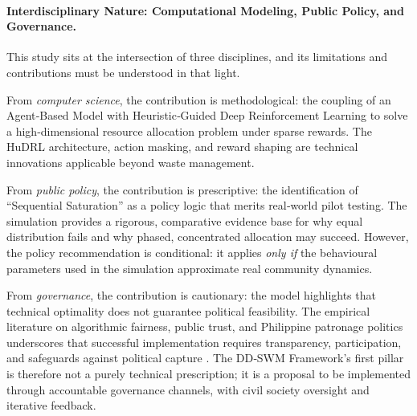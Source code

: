 \paragraph{Interdisciplinary Nature: Computational Modeling, Public Policy, and Governance.}
This study sits at the intersection of three disciplines, and its limitations and contributions must be understood in that light.

From \emph{computer science}, the contribution is methodological: the coupling of an Agent‑Based Model with Heuristic‑Guided Deep Reinforcement Learning to solve a high‑dimensional resource allocation problem under sparse rewards. The HuDRL architecture, action masking, and reward shaping are technical innovations applicable beyond waste management.

From \emph{public policy}, the contribution is prescriptive: the identification of “Sequential Saturation” as a policy logic that merits real‑world pilot testing. The simulation provides a rigorous, comparative evidence base for why equal distribution fails and why phased, concentrated allocation may succeed. However, the policy recommendation is conditional: it applies \emph{only if} the behavioural parameters used in the simulation approximate real community dynamics.

From \emph{governance}, the contribution is cautionary: the model highlights that technical optimality does not guarantee political feasibility. The empirical literature on algorithmic fairness, public trust, and Philippine patronage politics underscores that successful implementation requires transparency, participation, and safeguards against political capture \citep{TrustAIGov2025, CitizenPerceptionAI2025}. The DD‑SWM Framework’s first pillar is therefore not a purely technical prescription; it is a proposal to be implemented through accountable governance channels, with civil society oversight and iterative feedback.

